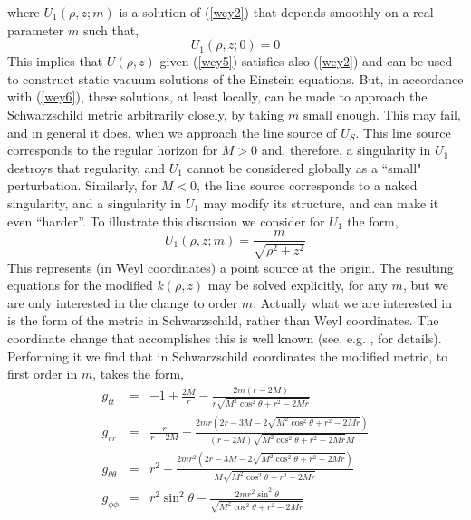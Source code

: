 \documentclass[12pt,aps,floats,showpacs,amssymb,tightenlines]{revtex4}
\begin{document}
where $U_1(\rho,z;m)$ is a solution of (\ref{wey2}) that depends smoothly on a real parameter
$m$ such that,
\begin{equation}
\label{wey6}
 U_1(\rho,z;0)= 0
\end{equation}
This implies that $U(\rho,z)$ given (\ref{wey5}) satisfies also (\ref{wey2}) and can be used
to construct static vacuum solutions of the Einstein equations. But, in accordance with
(\ref{wey6}), these solutions, at least locally, can be made to approach the Schwarzschild
metric arbitrarily closely, by taking $m$ small enough. This may fail, and in general it does,
 when we approach the line source of $U_S$. This line source corresponds to the regular horizon
 for $M>0$ and, therefore, a singularity in $U_1$ destroys that regularity, and $U_1$ cannot be
  considered globally as a ``small" perturbation. Similarly, for $M<0$, the line source
  corresponds to a naked singularity, and a singularity in $U_1$ may modify its structure,
  and can make it even ``harder''. To illustrate this discusion we consider for $U_1$ the form,
\begin{equation}
\label{wey7}
U_1(\rho,z;m) = \frac{m}{\sqrt{\rho^2+z^2}}
\end{equation}
This represents (in Weyl coordinates) a point source at the origin. The resulting equations
 for the modified $k(\rho,z)$ may be solved explicitly, for any $m$, but we are only interested
 in the change to order $m$. Actually what we are interested in is the form of the metric
 in Schwarzschild, rather than Weyl coordinates. The coordinate change that accomplishes
 this is well known (see, e.g. \cite{exactas}, for details). Performing it we find that
 in Schwarzschild coordinates the modified metric, to first order in $m$, takes the form,
\begin{eqnarray}
\label{wey8}
g_{tt} & = & -1+ {\frac {2M}{r}}-{\frac {2 m \left( r-2M \right) }{r
\sqrt {{M}^{2} \cos^2 \theta   +{r}^{2}
-2Mr}}}
\nonumber \\
g_{rr} & = & {\frac {r}{r-2 M}}+{\frac {2 mr \left( 2r-3M-2
\sqrt { {M}^{2} \cos^2 \theta +{r}^{2}
-2Mr} \right) }{ \left(r -2M\right) \sqrt { {M}^{2}\cos^2
\theta    +{r}^{2}-2Mr}M}}
\nonumber \\
g_{\theta \theta} & = & {r}^{2}+{\frac {2 m {r}^{2} \left(2 r -3M-2\sqrt {
 {M}^{2} \cos^2 \theta   +{r}^{2}-2Mr}
 \right) }{M\sqrt {M^2  \cos^2  \theta +{r}^{2}-2Mr}}}
\nonumber \\
g_{\phi \phi} & = &  r^2 \sin^2  \theta -{\frac {2 m r^2
  \sin^2  \theta  }{
\sqrt { M^2 \cos^2 \theta +{r}^{2}
-2Mr}}}
\end{eqnarray}
\end{document}
